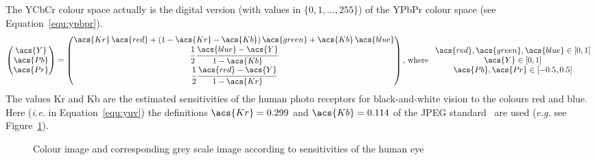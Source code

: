 \documentclass[12pt,a4paper,oneside,openright]{book}
\newcommand{\eg}{\emph{e.g.} }
\newcommand{\ie}{\emph{i.e.} }
\newcommand{\equ}[1]{Equation~\ref{equ:#1}}
\newcommand{\fig}[1]{Figure~\ref{fig:#1}}
\begin{document}
\begin{CJK}{UTF8}{}
The \acs{Y}\acs{Cb}\acs{Cr} colour space actually is the digital version (with values in $\{0,1,\ldots,255\}$) of the \acs{Y}\acs{Pb}\acs{Pr} colour space (see \equ{ypbpr}).
\begin{equation}\label{equ:ypbpr}
  \begin{pmatrix}\acs{Y}\\\acs{Pb}\\\acs{Pr}\end{pmatrix}=
  \begin{pmatrix}\acs{Kr}\,\acs{red}+(1-\acs{Kr}-\acs{Kb})\,\acs{green}+\acs{Kb}\,\acs{blue}\\
    \cfrac{1}{2}\,\cfrac{\acs{blue}-\acs{Y}}{1-\acs{Kb}}\\
    \cfrac{1}{2}\,\cfrac{\acs{red}-\acs{Y}}{1-\acs{Kr}}\end{pmatrix}\mathrm{,\,where\ }
  \begin{array}{c}
    \acs{red},\acs{green},\acs{blue}\in[0,1]\\
    \acs{Y}\in[0,1]\\
    \acs{Pb},\acs{Pr}\in[-0.5,0.5]
  \end{array}
\end{equation}
The values \acs{Kr} and \acs{Kb} are the estimated sensitivities of the human photo receptors for black-and-white vision to the colours red and blue. Here (\ie in \equ{yuv}) the definitions $\acs{Kr}=0.299$ and $\acs{Kb}=0.114$ of the \ac{JPEG} standard~\citep{RefWorks:441} are used (\eg see \fig{image}).
\begin{figure}[htbp]
   \begin{center}
     \begin{minipage}[c]{.495\textwidth}
     \end{minipage}
     \begin{minipage}[c]{.495\textwidth}
     \end{minipage}
     \caption{Colour image and corresponding grey scale image according to sensitivities of the human eye\label{fig:image}}
   \end{center}
\end{figure}


\end{CJK}
\end{document}
